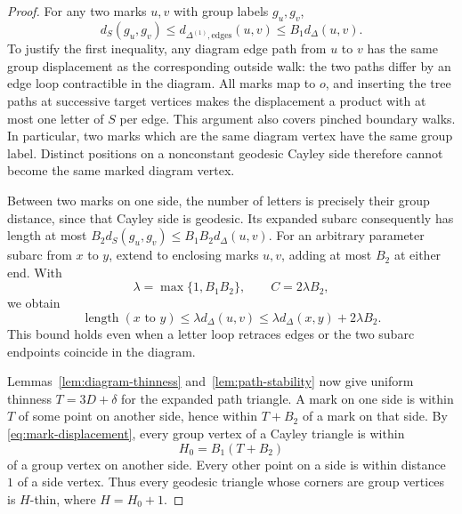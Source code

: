 \begin{proof}
For any two marks $u,v$ with group labels $g_u,g_v$,
\begin{equation}
 d_S(g_u,g_v)\le
 d_{\Delta^{(1)},\mathrm{edges}}(u,v)
 \le B_1d_\Delta(u,v).
 \label{eq:mark-displacement}
\end{equation}
To justify the first inequality, any diagram edge path from $u$ to $v$
has the same group displacement as the corresponding outside walk:
the two paths differ by an edge loop contractible in the diagram.
All marks map to $o$, and inserting the tree paths at successive target
vertices makes the displacement a product with at most one letter
of $S$ per edge. This argument also covers pinched boundary walks.
In particular, two marks which are the same diagram vertex have the
same group label. Distinct positions on a nonconstant geodesic Cayley
side therefore cannot become the same marked diagram vertex.

Between two marks on one side, the number of letters is precisely
their group distance, since that Cayley side is geodesic. Its expanded
subarc consequently has length at most
$B_2d_S(g_u,g_v)\le B_1B_2d_\Delta(u,v)$.
For an arbitrary parameter subarc from $x$ to $y$, extend to enclosing
marks $u,v$, adding at most $B_2$ at either end. With
\[
 \lambda=\max\{1,B_1B_2\},\qquad C=2\lambda B_2,
\]
we obtain
\[
 \operatorname{length}(x\text{ to }y)
 \le\lambda d_\Delta(u,v)
 \le\lambda d_\Delta(x,y)+2\lambda B_2.
\]
This bound holds even when a letter loop retraces edges or the two
subarc endpoints coincide in the diagram.

Lemmas~\ref{lem:diagram-thinness} and~\ref{lem:path-stability} now give
uniform thinness $T=3D+\delta$ for the expanded path triangle. A mark
on one side is within $T$ of some point on another side, hence within
$T+B_2$ of a mark on that side. By \eqref{eq:mark-displacement}, every
group vertex of a Cayley triangle is within
\[
 H_0=B_1(T+B_2)
\]
of a group vertex on another side. Every other point on a side is
within distance $1$ of a side vertex. Thus every geodesic triangle
whose corners are group vertices is $H$-thin, where $H=H_0+1$.


\end{proof}
